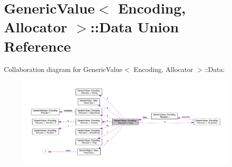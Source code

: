 \hypertarget{unionGenericValue_1_1Data}{}\section{Generic\+Value$<$ Encoding, Allocator $>$\+:\+:Data Union Reference}
\label{unionGenericValue_1_1Data}


Collaboration diagram for Generic\+Value$<$ Encoding, Allocator $>$\+:\+:Data\+:
\nopagebreak
\begin{figure}[H]
\begin{center}
\leavevmode
\includegraphics[width=350pt]{unionGenericValue_1_1Data__coll__graph}
\end{center}
\end{figure}
